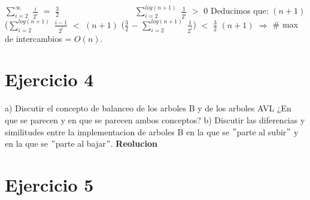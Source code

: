 \documentclass[10pt,a4paper]{article}
\begin{document}
\newline
\newline
$\displaystyle \sum_{i=2}^{\infty}$ $\displaystyle \frac{i}{2^{i}}$ $=$ $\displaystyle \frac{3}{2}$~~~~~~~~~~~~~~~~~~$\displaystyle \sum_{i=2}^{log(n+1)}$ $\displaystyle \frac{1}{2^{i}}$ $>$ $0$
\newline
\newline
\newline
Deducimos que:
\newline
\newline
$(n+1)$ ($\displaystyle \sum_{i=2}^{log(n+1)}$ $\displaystyle \frac{i-1}{2^{i}}$ $<$ $(n+1)$ ($\displaystyle \frac{3}{2}$ $-$ $\displaystyle \sum_{i=2}^{log(n+1)}$ $\displaystyle \frac{1}{2^{i}}$) $<$ $\displaystyle \frac{3}{2}$ $(n+1)$ $\Rightarrow$ \# max de intercambios = $O(n)$.
\newpage

\section{Ejercicio 4}

a) Discutir el concepto de balanceo de los arboles B y de los arboles AVL ¿En que se parecen y en que se parecen ambos conceptos?
\newline
\newline
b) Discutir las diferencias y similitudes entre la implementacion de arboles B en la que se $"$parte al subir$"$ y en la que se $"$parte al bajar$"$.
\newline
\newline
\textbf{Reolucion}
\newpage

\section{Ejercicio 5}
\end{document}
